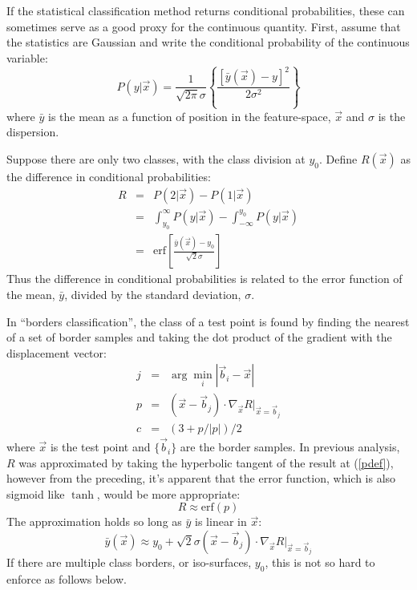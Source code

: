 \documentclass{article}
\begin{document}
If the statistical classification method returns conditional probabilities,
these can sometimes serve as a good proxy for the continuous quantity.
First, assume that the statistics are Gaussian and write the conditional
probability of the continuous variable:
\begin{equation}
P(y|\vec x) = \frac{1}{\sqrt {2 \pi} \sigma} 
	\left \lbrace \frac{[\bar y(\vec x) - y]^2}{2 \sigma^2} \right \rbrace
\end{equation}
where $\bar y$ is the mean as a function of position in the feature-space,
$\vec x$ and $\sigma$ is the dispersion.

Suppose there are only two classes, with the class division at $y_0$.
Define $R(\vec x)$ as the difference in conditional probabilities:
\begin{eqnarray}
R & = & P(2 | \vec x) - P(1 | \vec x) \\
& = & \int_{y_0}^\infty P(y | \vec x) - \int_{-\infty}^{y_0} P(y|\vec x) \\
& = & \mathrm{erf} \left [ \frac{\bar y(\vec x) - y_0}{\sqrt 2 \sigma} \right ]
\end{eqnarray}
Thus the difference in conditional probabilities is related to the error
function of the mean, $\bar y$, divided by the standard deviation, $\sigma$.

In ``borders classification'', the class of a test point is found by finding
the nearest of a set of border samples and taking the dot product of the
gradient with the displacement vector:
\begin{eqnarray}
j & = & \arg \min_i |\vec b_i - \vec x| \\
p & = & (\vec x - \vec b_j) \cdot \nabla_{\vec x} R |_{\vec x=\vec b_j} 
\label{pdef} \\
c & = & (3+p/|p|)/2
\end{eqnarray}
where $\vec x$ is the test point and $\lbrace \vec b_i \rbrace$ are the border
samples.  
In previous analysis, $R$ was approximated by taking the hyperbolic tangent of
the result at (\ref{pdef}), however from the preceding, it's apparent that the
error function, which is also sigmoid like $\tanh$, 
would be more appropriate:
\begin{equation}
R \approx \mathrm{erf}(p)
\end{equation}
The approximation holds so long as
$\bar y$ is linear in $\vec x$:
\begin{equation}
\bar y(\vec x) \approx y_0 + \sqrt 2 \sigma (\vec x - \vec b_j) \cdot \nabla_{\vec x} R |_{\vec x=\vec b_j}
\end{equation}
If there are multiple class borders, or iso-surfaces, $y_0$, this is not so
hard to enforce as follows below.
\end{document}
